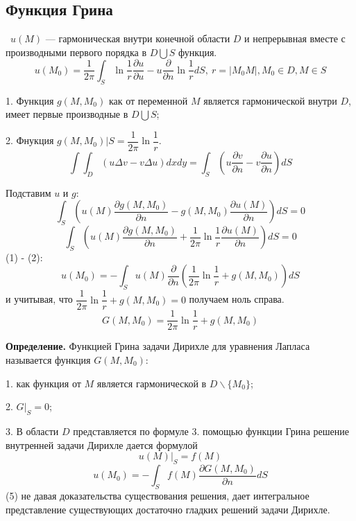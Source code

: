 \documentclass[9pt]{article}
\begin{document}
\subsection{Функция Грина}

\ 
 \(u(M)\) --- гармоническая внутри конечной области \(D\) и непрерывная вместе с производными первого порядка в \(D\bigcup S\) функция.
\begin{equation}
    u(M_0)=\dfrac{1}{2\pi}\int_S\ln\dfrac{1}{r}\dfrac{\partial u}{\partial u}-u\dfrac{\partial}{\partial n}\ln\dfrac{1}{r}dS,\ r=|M_0M|,M_0\in D,M\in S
\end{equation}
\par1. Функция \(g(M,M_0)\) как от переменной \(M\) является гармонической внутри \(D\), имеет первые производные в \(D\bigcup S\);
\par2. Фнукция \(g(M,M_0)|S=\dfrac{1}{2\pi}\ln\dfrac{1}{r}\).
\[\int\int_D(u\Delta v-v\Delta u)dxdy=\int_S(u\dfrac{\partial v}{\partial n}-v\dfrac{\partial u}{\partial n})dS\]
\par Подставим \(u\) и \(g\):
\[\int_S(u(M)\dfrac{\partial g(M,M_0)}{\partial n}-g(M,M_0)\dfrac{\partial u(M)}{\partial n})dS=0\]
\begin{equation}
    \int_S(u(M)\dfrac{\partial g(M,M_0)}{\partial n}+\dfrac{1}{2\pi}\ln\dfrac{1}{r}\dfrac{\partial u(M)}{\partial n})dS=0
\end{equation}
 (1) - (2):
\[u(M_0)=-\int_Su(M)\dfrac{\partial}{\partial n}(\dfrac{1}{2\pi}\ln\dfrac{1}{r}+g(M,M_0))dS\]
и учитывая, что \(\dfrac{1}{2\pi}\ln\dfrac{1}{r}+g(M,M_0)=0\) получаем ноль справа.
\begin{equation}
    G(M,M_0)=\dfrac{1}{2\pi}\ln\dfrac{1}{r}+g(M,M_0)
\end{equation}
\par\textbf{Определение.} Функцией Грина задачи Дирихле для уравнения Лапласа называется функция \(G(M,M_0)\):
\par1. как функция от \(M\) является гармонической в \(D\backslash\{M_0\}\);
\par2. \(G|_S=0\);
\par3. В области \(D\) представляется по формуле 3.
 помощью функции Грина решение внутренней задачи Дирихле дается формулой
\begin{equation}
    u(M)|_S=f(M)
\end{equation}
\begin{equation}
    u(M_0)=-\int_Sf(M)\dfrac{\partial G(M,M_0)}{\partial n}dS
\end{equation}
 (5) не давая доказательства существования решения, дает интегральное представление существующих достаточно гладких решений задачи Дирихле.
\end{document}
